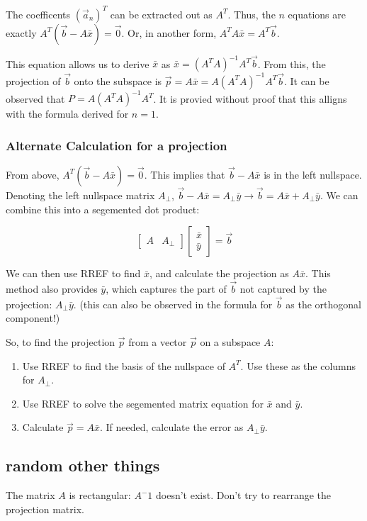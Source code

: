 \documentclass{article}
\begin{document}
The coefficents $(\vec{a}_n)^T$ can be extracted out as $A^T$.
Thus, the $n$ equations are exactly $A^T (\vec{b} - A \bar{x}) = \vec{0}$.
Or, in another form, $A^T A \bar{x} = A ^ T \vec{b}$.

This equation allows us to derive $\bar{x}$ as $\bar{x} = (A^T A) ^ {-1} A^T \vec{b}$.
From this, the projection of $\vec{b}$ onto the subspace is $\vec{p} = A \bar{x} = A (A^T A) ^ {-1} A^T \vec{b}$.
It can be observed that $P = A (A^T A) ^ {-1} A^T$.
It is provied without proof that this alligns with the formula derived for $n = 1$.

\subsubsection{Alternate Calculation for a projection}
From above, $A^T (\vec{b} - A \bar{x}) = \vec{0}$.
This implies that $\vec{b} - A \bar{x}$ is in the left nullspace.
Denoting the left nullspace matrix $A_{\perp}$, $\vec{b} - A \bar{x} = A_{\perp} \bar{y} \rightarrow \vec{b} = A \bar{x} + A_{\perp} \bar{y}$.
We can combine this into a segemented dot product:

\[
\begin{bmatrix} %
    A& A_{\perp}
\end{bmatrix}
\begin{bmatrix} %
    \bar{x} \\
    \bar{y}
\end{bmatrix}
=
\vec{b}
\]

We can then use RREF to find $\bar{x}$, and calculate the projection as $A \bar{x}$.
This method also provides $\bar{y}$, which captures the part of $\vec{b}$ not captured by the projection: $A_{\perp} \bar{y}$.
(this can also be observed in the formula for $\vec{b}$ as the orthogonal component!)

So, to find the projection $\vec{p}$ from a vector $\vec{p}$ on a subspace $A$:
\begin{enumerate}
    \item Use RREF to find the basis of the nullspace of $A^T$. Use these as the columns for $A_{\perp}$.
    \item Use RREF to solve the segemented matrix equation for $\bar{x}$ and $\bar{y}$.
    \item Calculate $\vec{p} = A \bar{x}$. If needed, calculate the error as $A_{\perp} \bar{y}$.
\end{enumerate}




\subsection{random other things}
The matrix $A$ is rectangular: $A^-1$ doesn't exist.
Don't try to rearrange the projection matrix.
\end{document}
